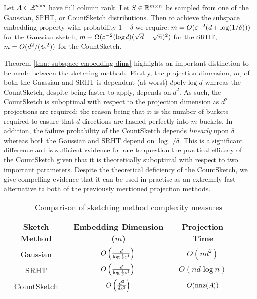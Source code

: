 \begin{thm} \label{thm: subspace-embedding-dims}
  Let $A \in \mathbb{R}^{n \times d}$ have full column rank.
  Let $S \in \mathbb{R}^{m \times n}$ be sampled from one of the Gaussian, SRHT, or
  CountSketch distributions.
  Then to achieve the subspace embedding property with probability
  $1 - \delta$ we require:
  $m = O(\varepsilon^{-2}(d + \log(1/\delta)))$ for the Gaussian sketch,
  $m = \Omega(\varepsilon^{-2}(\log d) (\sqrt{d} + \sqrt{n})^2)$ for the SRHT,
  $m = O(d^2/(\delta \varepsilon^2))$ for the CountSketch.
\end{thm}

Theorem \ref{thm: subspace-embedding-dims} highlights an important distinction
to be made between the sketching methods.
Firstly, the projection dimension, $m$, of both the Gaussian and SRHT is dependent
(at worst) $d \text{poly} \log d$ whereas the CountSketch, despite being faster to
apply, depends on $d^2$.
As such, the CountSketch is suboptimal with respect to the projection dimension
as $d^2$ projections are required: \color{red} the reason being that it is the number of buckets required to
ensure that $d$ directions are hashed perfectly into $m$ buckets.
\color{black} In addition, the failure probability of the CountSketch depends \textit{linearly}
upon $\delta$ whereas both the Gaussian and SRHT depend on $\log 1 / \delta$.
This is a significant difference and is sufficient evidence for one to question
the practical efficacy of the CountSketch given that it is theoretically suboptimal
with respect to two important parameters.
Despite the theoretical deficiency of the CountSketch, we give compelling evidence
that it can be used in practise as an extremely fast alternative to both of the
previously mentioned projection methods.

\begin{table}[ht]
\centering
\begin{adjustbox}{}
\begin{tabular}{|c|c|c|c|c|}
  \hline
Sketch Method  & Embedding Dimension ($m$)              &   Projection Time \\
\hline
Gaussian       & $O \left( \frac{d}{\log \frac{1}{\delta} \varepsilon^2}\right)$  &   $O(nd^2)$   \\
SRHT           & $O \left( \frac{d}{\log \frac{1}{\delta} \varepsilon^2} \right) $ &   $O(nd \log n)$ \\
CountSketch    & $O \left( \frac{d^2}{\delta \varepsilon^2} \right)$          &   $O(\text{nnz}(A))$ \\
\hline
\end{tabular}
\end{adjustbox}
\caption{Comparison of sketching method complexity measures}
\label{table: sketch-facts}
\end{table}


